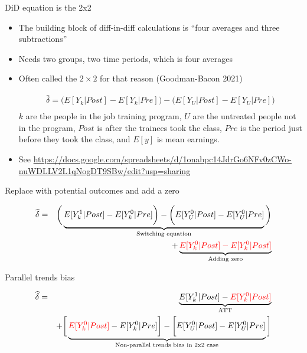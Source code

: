 \documentclass{beamer}
\begin{document}
\begin{frame}{DiD equation is the 2x2}

\begin{itemize}
\item The building block of diff-in-diff calculations is ``four averages and three subtractions''
\item Needs two groups, two time periods, which is four averages
\item Often called the $2 \times 2$ for that reason (Goodman-Bacon 2021)

\begin{eqnarray*}
\widehat{\delta} = \bigg ( E[Y_k|Post] - E[Y_k|Pre] \bigg ) - \bigg ( E[Y_U | Post ] - E[ Y_U | Pre] \bigg) \\
\end{eqnarray*}$k$ are the people in the job training program, $U$ are the untreated people not in the program, $Post$ is after the trainees took the class, $Pre$ is the period just before they took the class, and $E[y]$ is mean earnings.
\item See \url{https://docs.google.com/spreadsheets/d/1onabpc14JdrGo6NFv0zCWo-nuWDLLV2L1qNogDT9SBw/edit?usp=sharing}
\end{itemize}

\end{frame}



\begin{frame}{Replace with potential outcomes and add a zero}

\begin{eqnarray*}
\widehat{\delta} &=& \bigg ( \underbrace{E[Y^1_k|Post] - E[Y^0_k|Pre] \bigg ) - \bigg ( E[Y^0_U | Post ] - E[ Y^0_U | Pre]}_{\mathclap{\text{Switching equation}}} \bigg)  \\
&&+ \underbrace{\textcolor{red}{E[Y_k^0 |Post] - E[Y^0_k | Post]}}_{\mathclap{\text{Adding zero}}}
\end{eqnarray*}

\end{frame}

\begin{frame}{Parallel trends bias}

\begin{eqnarray*}
\widehat{\delta} &=& \underbrace{E[Y^1_k | Post] - \textcolor{red}{E[Y^0_k | Post]}}_{\mathclap{\text{ATT}}} \\
&& + \bigg [  \underbrace{\textcolor{red}{E[Y^0_k | Post]} - E[Y^0_k | Pre] \bigg ] - \bigg [ E[Y^0_U | Post] - E[Y_U^0 | Pre] }_{\mathclap{\text{Non-parallel trends bias in 2x2 case}}} \bigg ]
\end{eqnarray*}


\end{frame}
\end{document}

